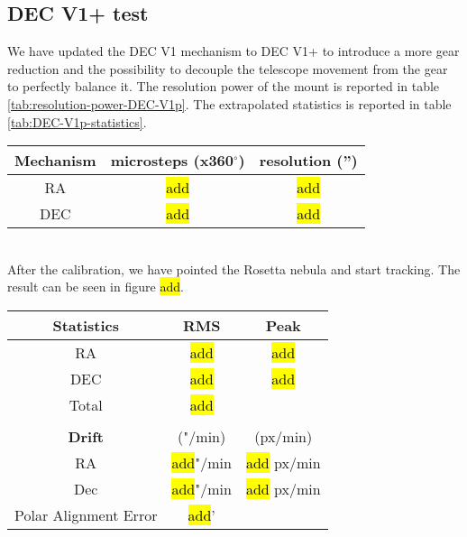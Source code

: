 \subsection{DEC V1+ test}
We have updated the DEC V1 mechanism to DEC V1+ to introduce a more gear reduction and the possibility to decouple the telescope movement from the gear to perfectly balance it.
The resolution power of the mount is reported in table \ref{tab:resolution-power-DEC-V1p}.
The extrapolated statistics is reported in table \ref{tab:DEC-V1p-statistics}.
\\
\begin{minipage}
    {.5\textwidth}
    \begin{tabular}{ccc}
        \textbf{Mechanism} & \textbf{microsteps (x360$^{\circ}$)} &\textbf{resolution ('')}\\
        \hline
        RA  & \hl{add} & \hl{add}\\ 
        DEC & \hl{add} & \hl{add}
    \end{tabular}
    \label{tab:resolution-power-DEC-V1p}
\end{minipage}
\\
After the calibration, we have pointed the Rosetta nebula and start tracking.
The result can be seen in figure \hl{add}.
\\
\begin{minipage}{.4\textwidth}
    \centering
    \begin{tabular}{ccc}
        \textbf{Statistics}&RMS&Peak\\
        \hline
        RA   & \hl{add}&\hl{add}\\
        DEC  & \hl{add}&\hl{add}\\
        Total& \hl{add}&\\
        \\
        \textbf{Drift}& ("/min) & (px/min)\\
        \hline
        RA& \hl{add}"/min& \hl{add} px/min\\
        Dec& \hl{add}"/min& \hl{add} px/min\\
        Polar Alignment Error& \hl{add}'&\\
        \hline
    \end{tabular}
    \label{tab:DEC-V1p-statistics}
\end{minipage}